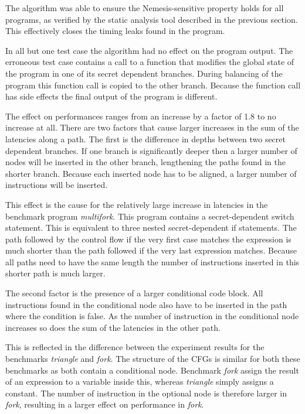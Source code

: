 The algorithm was able to ensure the Nemesis-sensitive property holds for all programs, as verified by the static analysis tool described in the previous section. This effectively closes the 
timing leaks found in the program. 

In all but one test case the algorithm had no effect on the program output. 
The erroneous test case contains a call to a function that modifies the global state of the program in one of its secret dependent branches. 
During balancing of the program this function call is copied to the other branch. 
Because the function call has side effects the final output of the program is different. 

The effect on performances ranges from an increase by a factor of 1.8 to no increase at all. 
There are two factors that cause larger increases in the sum of the latencies along a path. The first is the difference in depths between two secret dependent branches. 
If one branch is significantly deeper then a larger number of nodes will be inserted in the other branch, lengthening the paths found in the shorter branch. 
Because each inserted node has to be aligned, a larger number of instructions will be inserted. 

This effect is the cause for the relatively large increase in latencies in the benchmark  program \textit{multifork}. 
This program contains a secret-dependent switch statement. This is equivalent to three nested secret-dependent if statements. 
The path followed by the control flow if the very first case matches the expression is much shorter than the path followed if the very last expression matches. 
Because all paths need to have the same length the number of instructions inserted in this shorter path is much larger. 

The second factor is the presence of a larger conditional code block. All instructions found in the conditional node also have to be inserted in the path where the condition is false. 
As the number of instruction in the conditional node increases so does the sum of the latencies in the other path.

This is reflected in the difference between the experiment results for the benchmarks \textit{triangle} and \textit{fork}. The structure of the CFGs is similar for both these benchmarks as both contain a conditional node.
Benchmark \textit{fork} assign the result of an expression to a variable inside this, whereas \textit{triangle} simply assigns a constant. The number of instruction in the optional node is therefore larger in \textit{fork}, resulting 
in a larger effect on performance in \textit{fork}.

